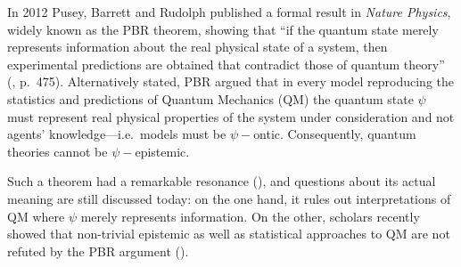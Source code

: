 \documentclass[twocolumn,prl,floatfix,superscriptaddress]{revtex4-2}
\begin{document}
 
In 2012 Pusey, Barrett and Rudolph published a formal result in \emph{Nature Physics}, widely known as the PBR theorem, showing that ``if the quantum state merely represents information about the real physical state of a system, then experimental predictions are obtained that contradict those of quantum theory'' (\cite{PBR:2012}, p.\ 475). Alternatively stated, PBR argued that in every model reproducing the statistics and predictions of Quantum Mechanics (QM) the quantum state $\psi$ must represent real physical properties of the system under consideration and not agents' knowledge---i.e.\ models must be $\psi-$ontic. Consequently, quantum theories cannot be $\psi-$epistemic. 

Such a theorem had a remarkable resonance (\cite{Leifer:2014, Leifer:2014b, Renner:2012, Colbeck:2017, Hardy:2013, Maroney:2014, Patra:2013, Mansfield:2016, Schlosshauer:2012, Schlosshauer:2013, Schlosshauer:2014, Aaronson:2013}), and questions about its actual meaning are still discussed today: on the one hand, it rules out interpretations of QM where $\psi$ merely represents information. On the other, scholars recently showed that non-trivial epistemic as well as statistical approaches to QM are not refuted by the PBR argument (\cite{Ben:2017, Rizzi:2018, Oldofredi:2021, DeBrota:2019}).
	
\end{document}
